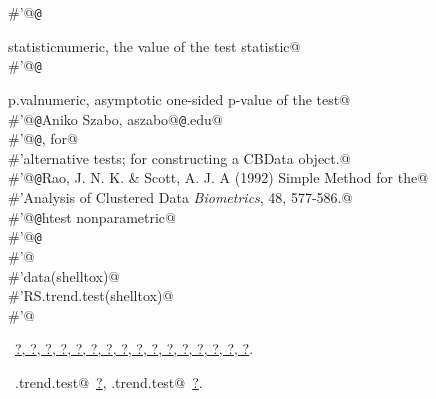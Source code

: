 \documentclass[reqno]{amsart}
\renewcommand{\NWlink}[2]{\hyperlink{#1}{#2}}
\begin{document}
\begin{flushleft}
\begin{list}{}{}
\mbox{}\verb@#'@{\tt @}\verb@return \item{statistic}{numeric, the value of the test statistic}@\\
\mbox{}\verb@#'@{\tt @}\verb@return \item{p.val}{numeric, asymptotic one-sided p-value of the test}@\\
\mbox{}\verb@#'@{\tt @}\verb@author Aniko Szabo, aszabo@{\tt @}\verb@mcw.edu@\\
\mbox{}\verb@#'@{\tt @}\verb@seealso {},  for@\\
\mbox{}\verb@#'alternative tests;  for constructing a CBData object.@\\
\mbox{}\verb@#'@{\tt @}\verb@references Rao, J. N. K. & Scott, A. J. A (1992) Simple Method for the@\\
\mbox{}\verb@#'Analysis of Clustered Data \emph{Biometrics}, 48, 577-586.@\\
\mbox{}\verb@#'@{\tt @}\verb@keywords htest nonparametric@\\
\mbox{}\verb@#'@{\tt @}\verb@examples@\\
\mbox{}\verb@#'@\\
\mbox{}\verb@#'data(shelltox)@\\
\mbox{}\verb@#'RS.trend.test(shelltox)@\\
\mbox{}\verb@#'@\\
\mbox{}\verb@@{\NWsep}
\end{list}
\vspace{-1.5ex}
\footnotesize
\begin{list}{}{\setlength{\itemsep}{-\parsep}\setlength{\itemindent}{-\leftmargin}}
\item \NWtxtFileDefBy\ \NWlink{nuweb?}{?}\NWlink{nuweb?}{, ?}\NWlink{nuweb?}{, ?}\NWlink{nuweb?}{, ?}\NWlink{nuweb?}{, ?}\NWlink{nuweb?}{, ?}\NWlink{nuweb?}{, ?}\NWlink{nuweb?}{, ?}\NWlink{nuweb?}{, ?}\NWlink{nuweb?}{, ?}\NWlink{nuweb?}{, ?}\NWlink{nuweb?}{, ?}\NWlink{nuweb?}{, ?}\NWlink{nuweb?}{, ?}\NWlink{nuweb?}{, ?}\NWlink{nuweb?}{, ?}.
\item \NWtxtIdentsUsed\nobreak\  \verb@GEE.trend.test@\nobreak\ \NWlink{nuweb?}{?}, \verb@RS.trend.test@\nobreak\ \NWlink{nuweb?}{?}.
\item{}
\end{list}
\vspace{4ex}
\end{flushleft}
\end{document}

